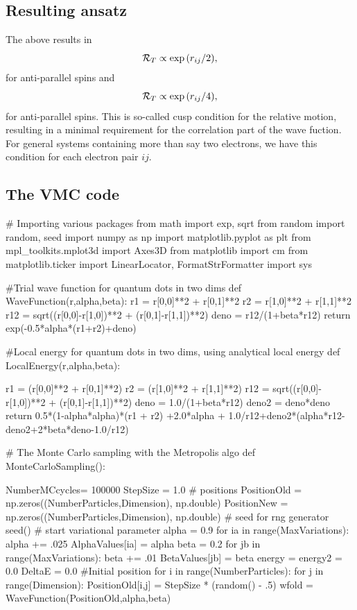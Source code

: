 \documentclass[%
oneside,                 %
final,                   %
10pt]{article}
\begin{document}
\subsection{Resulting ansatz}
The above  results in
\[
{\cal R}_T  \propto \exp{(r_{ij}/2)}, 
\]
for anti-parallel spins and 
\[
{\cal R}_T  \propto \exp{(r_{ij}/4)}, 
\]
for anti-parallel spins. 
This is so-called cusp condition for the relative motion, resulting in a minimal requirement
for the correlation part of the wave fuction.
For general systems containing more than say two electrons, we have this
condition for each electron pair $ij$.





\subsection{The VMC code}

\bpycod
# Importing various packages
from math import exp, sqrt
from random import random, seed
import numpy as np
import matplotlib.pyplot as plt
from mpl_toolkits.mplot3d import Axes3D
from matplotlib import cm
from matplotlib.ticker import LinearLocator, FormatStrFormatter
import sys

#Trial wave function for quantum dots in two dims
def WaveFunction(r,alpha,beta):
    r1 = r[0,0]**2 + r[0,1]**2
    r2 = r[1,0]**2 + r[1,1]**2
    r12 = sqrt((r[0,0]-r[1,0])**2 + (r[0,1]-r[1,1])**2)
    deno = r12/(1+beta*r12)
    return exp(-0.5*alpha*(r1+r2)+deno)

#Local energy  for quantum dots in two dims, using analytical local energy
def LocalEnergy(r,alpha,beta):
    
    r1 = (r[0,0]**2 + r[0,1]**2)
    r2 = (r[1,0]**2 + r[1,1]**2)
    r12 = sqrt((r[0,0]-r[1,0])**2 + (r[0,1]-r[1,1])**2)
    deno = 1.0/(1+beta*r12)
    deno2 = deno*deno
    return 0.5*(1-alpha*alpha)*(r1 + r2) +2.0*alpha + 1.0/r12+deno2*(alpha*r12-deno2+2*beta*deno-1.0/r12)

# The Monte Carlo sampling with the Metropolis algo
def MonteCarloSampling():

    NumberMCcycles= 100000
    StepSize = 1.0
    # positions
    PositionOld = np.zeros((NumberParticles,Dimension), np.double)
    PositionNew = np.zeros((NumberParticles,Dimension), np.double)
    # seed for rng generator
    seed()
    # start variational parameter
    alpha = 0.9
    for ia in range(MaxVariations):
        alpha += .025
        AlphaValues[ia] = alpha
        beta = 0.2 
        for jb in range(MaxVariations):
            beta += .01
            BetaValues[jb] = beta
            energy = energy2 = 0.0
            DeltaE = 0.0
            #Initial position
            for i in range(NumberParticles):
                for j in range(Dimension):
                    PositionOld[i,j] = StepSize * (random() - .5)
            wfold = WaveFunction(PositionOld,alpha,beta)
\end{document}
